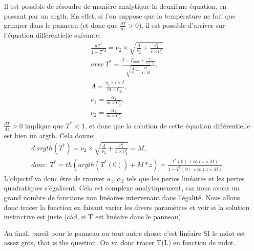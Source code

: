 \documentclass[letterpaper,10pt,english]{sphinxmanual}
\begin{document}
Il est possible de résoudre de manière analytique la deuxième équation, en passant par un argth. En effet, si l’on suppose que la température ne fait que grimper dans le panneau (et donc que \(\frac{dT}{dz}>0\)), il est possible d’arriver sur l’équation différentielle suivante:
\begin{equation*}
\begin{split}
\frac{dT^*}{1-T^{*2}} = \nu_2 \times \sqrt{\frac{A}{\nu_2}+\frac{\nu_1^2}{4 \times \nu_2^2}} \\
avec \ T^* = \frac{T-T_{amb}+\frac{\nu_1}{2 \times \nu_2}}{\sqrt{\frac{A}{\nu_2}+\frac{\nu_1^2}{4 \times \nu_2^2}}} , \\
 A = \frac{\eta_0 \times l \times I}{\dot{m} \times C_p}, \\
 \nu_1 = \frac{\alpha_1}{\dot{m} \times C_p}, \\
 \nu_2 = \frac{\alpha_2}{\dot{m} \times C_p}
\end{split}
\end{equation*}
\(\frac{dT}{dz}>0\) implique que \(T^*<1\), et donc que la solution de cette équation différentielle est bien un argth. Cela donne:
\begin{equation*}
\begin{split}
d \ argth(T^*) = \nu_2 \times \sqrt{\frac{A}{\nu_2}+\frac{\nu_1^2}{4 \times \nu_2^2}} = M, \\
donc: \ T^* = th(argth(T^*(0))+M*z) = \frac{T^*(0)+th (z \times M)}{1+T^*(0) \times th(z \times M)}
\end{split}
\end{equation*}
L’objectif va donc être de trouver \(\alpha_1 , \alpha_2\) tels que les pertes linéaires et les pertes quadratiques s’égalisent. Cela est complexe analytiquement, car nous avons un grand nombre de fonctions non linéaires intervenant dans l’égalité. Nous allons donc tracer la fonction en faisant varier les divers paramètres et voir si la solution instinctive est juste (càd, si T est linéaire dans le panneau).

Au final, pareil pour le panneau ou tout autre chose: c’est linéaire SI le mdot est assez gros, that is the question. On va donc tracer T(L) en fonction de mdot.

\begin{sphinxVerbatim}[commandchars=\\\{\}]
 
  
  
\end{sphinxVerbatim}
\end{document}
